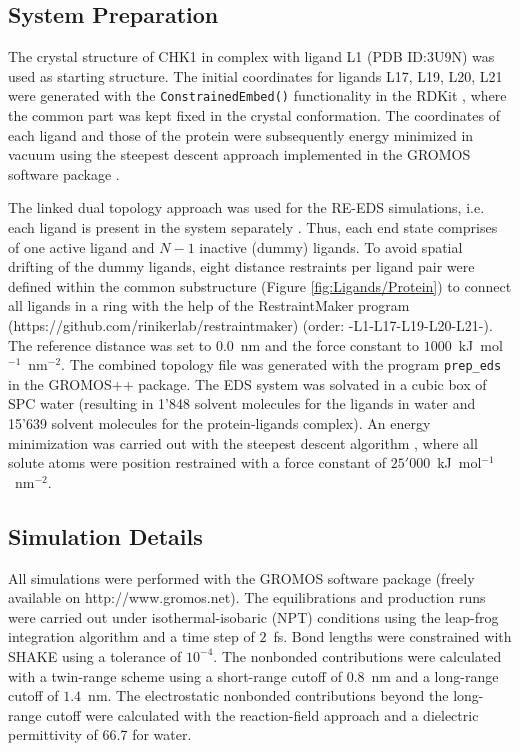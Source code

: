 \subsection{System Preparation}%
The crystal structure of CHK1 in complex with ligand L1 (PDB ID:3U9N) was used as starting structure. The initial coordinates for ligands L17, L19, L20, L21 were generated with the {\tt{ConstrainedEmbed()}} functionality in the RDKit \cite{Landrum2021}, where the common part was kept fixed in the crystal conformation. The coordinates of each ligand and those of the protein were subsequently energy minimized in vacuum using the steepest descent \cite{Ruder2016} approach implemented in the GROMOS software package \cite{Schmid2012}. 

The linked dual topology approach was used for the RE-EDS simulations, i.e. each ligand is present in the system separately \cite{Riniker2011}. Thus, each end state comprises of one active ligand and $N-1$ inactive (dummy) ligands. To avoid spatial drifting of the dummy ligands, eight distance restraints per ligand pair were defined within the common substructure (Figure \ref{fig:Ligands/Protein}) to connect all ligands in a ring with the help of the RestraintMaker program (https://github.com/rinikerlab/restraintmaker) (order: -L1-L17-L19-L20-L21-). The reference distance was set to 0.0~nm and the force constant to $1000$~kJ~mol$^{-1}$~nm$^{-2}$.
The combined topology file was generated with the program {\tt{prep\_eds}} in the GROMOS++ \cite{Eichenberger2011} package. 
The EDS system was solvated in a cubic box of SPC \cite{Berendsen1981} water (resulting in 1'848 solvent molecules for the ligands in water and 15'639 solvent molecules for the protein-ligands complex). 
An energy minimization was carried out with the steepest descent algorithm \cite{Ruder2016}, where all solute atoms were position restrained with a force constant of $25'000$~kJ~mol$^{-1}$~nm$^{-2}$. 

\subsection{Simulation Details}
All simulations were performed with the GROMOS software package \cite{Schmid2012} (freely available on http://www.gromos.net).
The equilibrations and production runs were carried out under isothermal-isobaric (NPT) conditions using the leap-frog integration algorithm \cite{Hockney1970} and a time step of $2$~fs. 
Bond lengths were constrained with SHAKE \cite{Ryckaert1977} using a tolerance of $10^{-4}$. 
The nonbonded contributions were calculated with a twin-range scheme using a short-range cutoff of $0.8$~nm and a long-range cutoff of $1.4$~nm. 
The electrostatic nonbonded contributions beyond the long-range cutoff were calculated with the reaction-field \cite{Tironi1995} approach and a dielectric permittivity of 66.7 \cite{Glattli2002} for water. 


